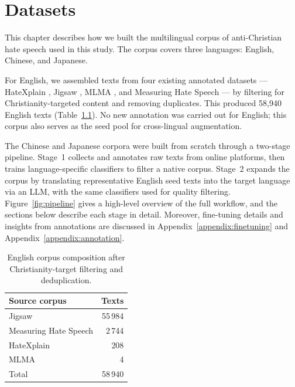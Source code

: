 \documentclass[../CLthesis.tex]{subfiles}
\begin{document}
\chapter{Datasets}%
\label{chap:material}

This chapter describes how we built the multilingual corpus of anti-Christian hate speech used in this study. The corpus covers three languages: English, Chinese, and Japanese.

For English, we assembled texts from four existing annotated datasets --- HateXplain \citep{mathew_hatexplain_2021}, Jigsaw \citep{jigsaw-unintended-bias}, MLMA \citep{mlma}, and Measuring Hate Speech \citep{measuring-hate-speech} --- by filtering for Christianity-targeted content and removing duplicates. This produced 58,940 English texts (Table~\ref{tab:english-sources}). No new annotation was carried out for English; this corpus also serves as the seed pool for cross-lingual augmentation.

The Chinese and Japanese corpora were built from scratch through a two-stage pipeline. Stage~1 collects and annotates raw texts from online platforms, then trains language-specific classifiers to filter a native corpus. Stage~2 expands the corpus by translating representative English seed texts into the target language via an LLM, with the same classifiers used for quality filtering. Figure~\ref{fig:pipeline} gives a high-level overview of the full workflow, and the sections below describe each stage in detail. Moreover, fine-tuning details and insights from annotations are discussed in Appendix~\ref{appendix:finetuning} and Appendix~\ref{appendix:annotation}.

\begin{table}[htbp]
\centering
\small
\begin{tabular}{@{}lr@{}}
\toprule
Source corpus & Texts \\
\midrule
Jigsaw                  & 55\,984 \\
Measuring Hate Speech   & 2\,744  \\
HateXplain              & 208     \\
MLMA                    & 4       \\
\midrule
Total                   & 58\,940 \\
\bottomrule
\end{tabular}
\caption{English corpus composition after Christianity-target filtering and deduplication.}
\label{tab:english-sources}
\end{table}
\end{document}
